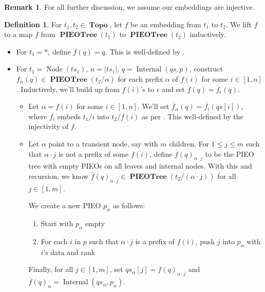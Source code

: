 \documentclass{amsart}
\DeclareMathOperator{\Topo}{\mathbf{Topo}}
\DeclareMathOperator{\PIEOTree}{\mathbf{PIEOTree}}
\DeclareMathOperator{\Internal}{\mathrm{Internal}}
\DeclareMathOperator{\Node}{\mathrm{Node}}
\theoremstyle{definition}
\newtheorem{dfn}[thm]{Definition}
\newtheorem{rem}[thm]{Remark}
\begin{document}
\begin{rem}
    For all further discussion, we assume our embeddings are injective.
\end{rem}

\begin{dfn}
    For $t_1, t_2 \in \Topo$, let $f$ be an embedding from $t_1$ to $t_2$.
    We lift $f$ to a map $\overline{f}$ from $\PIEOTree(t_1)$ to $\PIEOTree(t_2)$ inductively.
    \begin{itemize}
        \item For $t_1 = \ast$, define $\overline{f}(q) = q$. This is well-defined by \cite[Lemma ~5.2]{OG}.
        \item For $t_1 = \Node(ts_1)$, $n = |ts_1|$, $q = \Internal(qs, p)$, 
            construct $\overline{f}_{\alpha}(q) \in \PIEOTree(t_2/\alpha)$ for each prefix $\alpha$ of $f(i)$ for some $i \in [1,n]$.
            Inductively, we'll build up from $f(i)$'s to $\epsilon$ and set $\overline{f}(q) = \overline{f}_\epsilon(q)$.
            \begin{itemize}
                \item Let $\alpha = f(i)$ for some $i \in [1,n]$. We'll set $\overline{f}_\alpha(q) = \overline{f_i}(qs[i])$, 
                    where $f_i$ embeds $t_1/i$ into $t_2/f(i)$ as per \cite[Lemma 5.2]{OG}.
                    This well-defined by the injectivity of $f$.
                \item Let $\alpha$ point to a transient node, say with $m$ children.
                    For $1 \leq j \leq m$ such that $\alpha \cdot j$ is not a prefix of some $f(i)$, 
                    define $\overline{f}(q)_{\alpha \cdot j}$ to be the PIEO tree with empty PIEOs on all leaves and internal nodes. 
                    With this and recursion, we know $\overline{f}(q)_{\alpha \cdot j} \in \PIEOTree(t_2/(\alpha \cdot j))$ for all $j \in [1, m]$.

                    We create a new PIEO $p_\alpha$ as follows:
                    \begin{enumerate} 
                        \item Start with $p_\alpha$ empty
                        \item For each $i$ in $p$ such that $\alpha \cdot j$ is a prefix of $f(i)$, push $j$ into $p_\alpha$ with $i$'s data and rank
                    \end{enumerate}

                    Finally, for all $j \in [1,m]$, set $qs_\alpha[j] = \overline{f}(q)_{\alpha \cdot j}$ and $\overline{f}(q)_\alpha = \Internal(qs_\alpha, p_\alpha)$.
            \end{itemize}
    \end{itemize}
\end{dfn}
\end{document}
